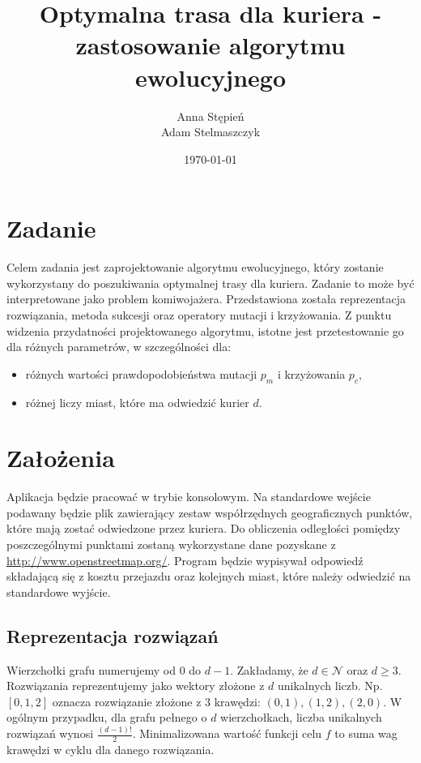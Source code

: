 \documentclass[12pt, a4paper]{article}
\title{\textbf{Optymalna trasa dla kuriera - zastosowanie algorytmu ewolucyjnego}}
\author{Anna Stępień \\ Adam Stelmaszczyk}
\date{\today}
\begin{document}
\maketitle

\section{Zadanie}
Celem zadania jest zaprojektowanie algorytmu ewolucyjnego, który zostanie wykorzystany do poszukiwania optymalnej trasy dla kuriera. Zadanie to może być interpretowane jako problem komiwojażera.
Przedstawiona została reprezentacja rozwiązania, metoda sukcesji oraz operatory mutacji i krzyżowania. 
Z punktu widzenia przydatności projektowanego algorytmu, istotne jest przetestowanie go dla różnych parametrów, w szczególności dla:
\begin{itemize}
	\item różnych wartości prawdopodobieństwa mutacji $p_m$ i krzyżowania $p_c$,
	\item różnej liczy miast, które ma odwiedzić kurier $d$.
\end{itemize}

\section{Założenia}
Aplikacja będzie pracować w trybie konsolowym. Na standardowe wejście podawany będzie plik zawierający zestaw współrzędnych geograficznych punktów, które mają zostać odwiedzone przez kuriera. Do obliczenia odległości pomiędzy poszczególnymi punktami zostaną wykorzystane dane pozyskane z \url{http://www.openstreetmap.org/}.
Program będzie wypisywał odpowiedź składającą się z kosztu przejazdu oraz kolejnych miast, które należy odwiedzić na standardowe wyjście.

\subsection{Reprezentacja rozwiązań}

Wierzchołki grafu numerujemy od 0 do $d - 1$. Zakładamy, że $d \in \mathcal{N}$ oraz $d \geq 3$. 
Rozwiązania reprezentujemy jako wektory złożone z $d$ unikalnych liczb. 
Np. $[0,1,2]$ oznacza rozwiązanie złożone z 3 krawędzi: $(0,1), (1,2), (2,0)$. 
W ogólnym przypadku, dla grafu pełnego o $d$ wierzchołkach, liczba unikalnych rozwiązań wynosi $\frac{(d-1)!}{2}$. 
Minimalizowana wartość funkcji celu $f$ to suma wag krawędzi w cyklu dla danego rozwiązania.
\end{document}
